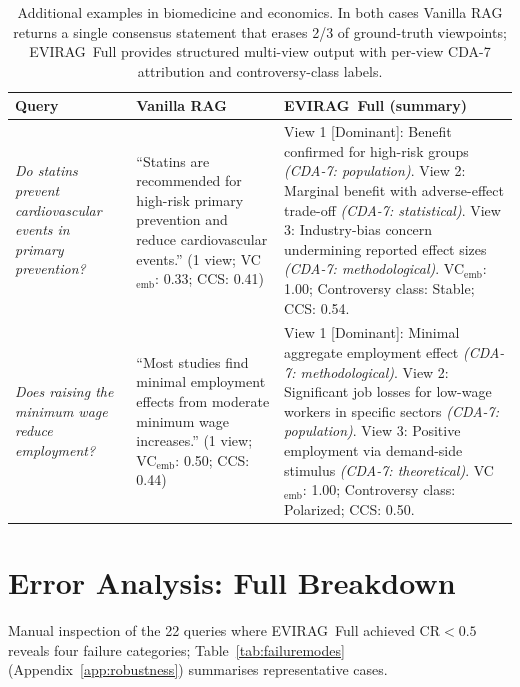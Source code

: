 \documentclass[11pt]{article}
\newcommand{\system}{\textsc{EVIRAG}\xspace}
\begin{document}
\begin{table}[t]
\centering\small
\setlength{\tabcolsep}{5pt}
\begin{tabular}{@{}p{}p{}p{}@{}}
\toprule
\textbf{Query} & \textbf{Vanilla RAG} & \textbf{\system\ Full (summary)} \\
\midrule
\textit{Do statins prevent cardiovascular events in primary prevention?}
&
``Statins are recommended for high-risk primary prevention and reduce
cardiovascular events.'' (1 view; VC$_\text{emb}$: 0.33; CCS: 0.41)
&
View 1 [Dominant]: Benefit confirmed for high-risk groups
\textit{(CDA-7: population)}.
View 2: Marginal benefit with adverse-effect trade-off
\textit{(CDA-7: statistical)}.
View 3: Industry-bias concern undermining reported effect sizes
\textit{(CDA-7: methodological)}.
VC$_\text{emb}$: 1.00; Controversy class: Stable; CCS: 0.54.
\\[4pt]
\textit{Does raising the minimum wage reduce employment?}
&
``Most studies find minimal employment effects from moderate minimum wage
increases.'' (1 view; VC$_\text{emb}$: 0.50; CCS: 0.44)
&
View 1 [Dominant]: Minimal aggregate employment effect
\textit{(CDA-7: methodological)}.
View 2: Significant job losses for low-wage workers in specific sectors
\textit{(CDA-7: population)}.
View 3: Positive employment via demand-side stimulus
\textit{(CDA-7: theoretical)}.
VC$_\text{emb}$: 1.00; Controversy class: Polarized; CCS: 0.50.
\\
\bottomrule
\end{tabular}
\caption{Additional examples in biomedicine and economics.  In both cases
Vanilla RAG returns a single consensus statement that erases 2/3 of
ground-truth viewpoints; \system\ Full provides structured multi-view output
with per-view CDA-7 attribution and controversy-class labels.}
\label{tab:qualitative2}
\end{table}


\section{Error Analysis: Full Breakdown}
\label{app:error}

Manual inspection of the 22 queries where \system\ Full achieved
CR${<}0.5$ reveals four failure categories; Table~\ref{tab:failuremodes}
(Appendix~\ref{app:robustness}) summarises representative cases.
\end{document}
